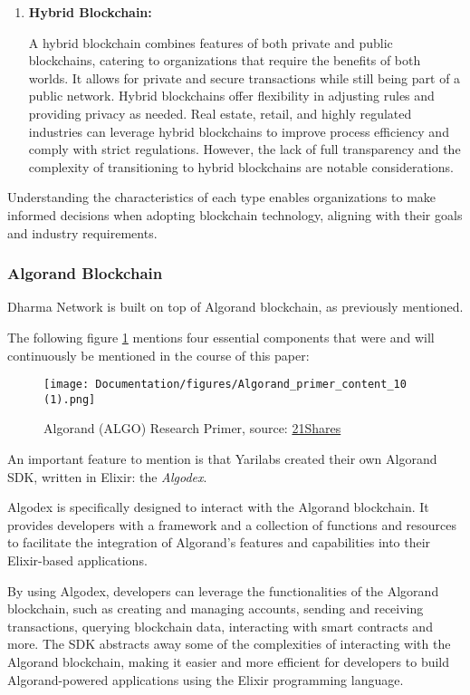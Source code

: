 \begin{enumerate}
    \item \textbf{Hybrid Blockchain:}

    A hybrid blockchain combines features of both private and public blockchains, catering to organizations that require the benefits of both worlds. It allows for private and secure transactions while still being part of a public network. Hybrid blockchains offer flexibility in adjusting rules and providing privacy as needed. Real estate, retail, and highly regulated industries can leverage hybrid blockchains to improve process efficiency and comply with strict regulations. However, the lack of full transparency and the complexity of transitioning to hybrid blockchains are notable considerations.
\end{enumerate}

Understanding the characteristics of each type enables organizations to make informed decisions when adopting blockchain technology, aligning with their goals and industry requirements.

\subsubsection{Algorand Blockchain}\label{algo_bc}

Dharma Network is built on top of Algorand blockchain, as previously mentioned. 

The following figure \ref{fig:algoprimer} mentions four essential components that were and will continuously be mentioned in the course of this paper:

\begin{figure}[htbp]
	\centering
	\texttt{[image: Documentation/figures/Algorand\_primer\_content\_10 (1).png]}  %
	\caption{Algorand (ALGO) Research Primer, source: \href{https://21shares.com/research/algorand-research-primer}{21Shares}}
	\label{fig:algoprimer}
\end{figure}

\begin{tcolorbox}[colback=white!20!white,colframe=red!80!black,rounded corners]
\danger An important feature to mention is that Yarilabs created their own Algorand SDK\footnotemark, written in Elixir: the \textit{Algodex}.\newline

Algodex is specifically designed to interact with the Algorand blockchain. It provides developers with a framework and a collection of functions and resources to facilitate the integration of Algorand's features and capabilities into their Elixir-based applications.\newline

By using Algodex, developers can leverage the functionalities of the Algorand blockchain, such as creating and managing accounts, sending and receiving transactions, querying blockchain data, interacting with smart contracts and more. The SDK abstracts away some of the complexities of interacting with the Algorand blockchain, making it easier and more efficient for developers to build Algorand-powered applications using the Elixir programming language.\danger
\end{tcolorbox}

